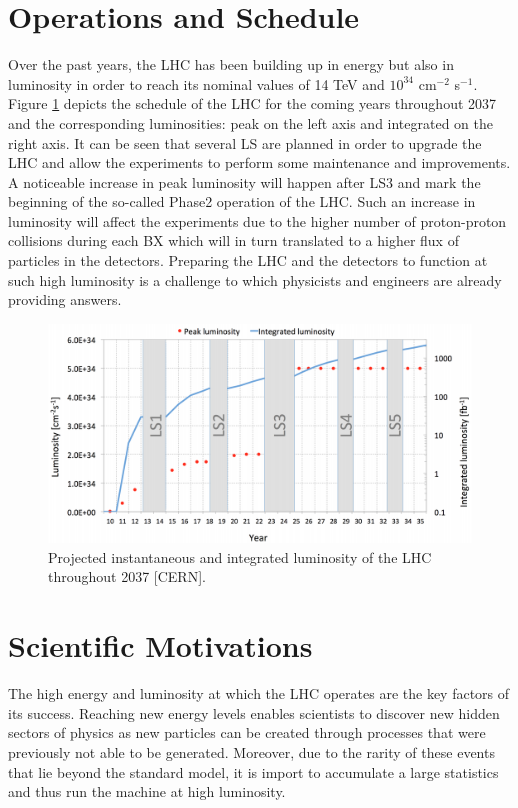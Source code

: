 	\section{Operations and Schedule}
  \label{sec:I-2-lhc-schedule}

    Over the past years, the LHC has been building up in energy but also in luminosity in order to reach its nominal values of 14 TeV and $ 10^{34} $ cm$^{-2}$ s$^{-1}$. Figure \ref{fig:I-2-luminosity} depicts the schedule of the LHC for the coming years throughout 2037 and the corresponding luminosities: peak on the left axis and integrated on the right axis. It can be seen that several LS are planned in order to upgrade the LHC and allow the experiments to perform some maintenance and improvements. A noticeable increase in peak luminosity will happen after LS3 and mark the beginning of the so-called Phase2 operation of the LHC. Such an increase in luminosity will affect the experiments due to the higher number of proton-proton collisions during each BX which will in turn translated to a higher flux of particles in the detectors. Preparing the LHC and the detectors to function at such high luminosity is a challenge to which physicists and engineers are already providing answers.

    \begin{figure}[h!]
      \centering
      \includegraphics[width=\textwidth]{img/I-2-LHC/lhc-schedule.png}
      \caption{Projected instantaneous and integrated luminosity of the LHC throughout 2037 [CERN].}
      \label{fig:I-2-luminosity}
    \end{figure}

  \section{Scientific Motivations}

    The high energy and luminosity at which the LHC operates are the key factors of its success. Reaching new energy levels enables scientists to discover new hidden sectors of physics as new particles can be created through processes that were previously not able to be generated. Moreover, due to the rarity of these events that lie beyond the standard model, it is import to accumulate a large statistics and thus run the machine at high luminosity. \\

